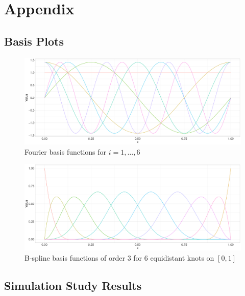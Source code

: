\documentclass[11pt,twoside,a4paper]{article}
\begin{document}
	\newpage
	\section{Appendix}
	
	\subsection{Basis Plots}
	
	\begin{figure}[H]\label{fourier_basis}
		\includegraphics[width = \textwidth]{../Graphics/Fourier_Basis.pdf}
		\caption{Fourier basis functions for $i = 1,\dots,6$}
	\end{figure}
	
	\begin{figure}[H]\label{bspline_basis}
		\includegraphics[width = \textwidth]{../Graphics/Bspline_Basis.pdf}
		\caption{B-spline basis functions of order 3 for 6 equidistant knots on $[0,1]$}
	\end{figure}
\newpage
	\subsection{Simulation Study Results}
	
\end{document}
